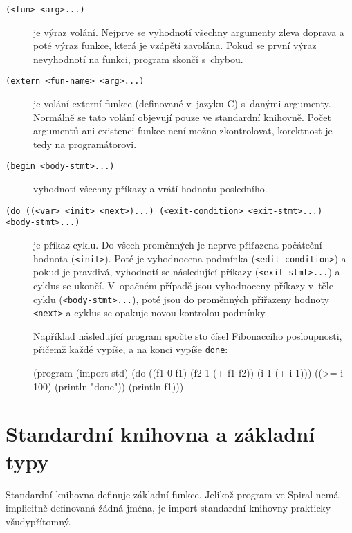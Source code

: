 \begin{description}
  \item[\texttt{(<fun> <arg>...)}] je výraz volání. Nejprve se vyhodnotí
    všechny argumenty zleva doprava a poté výraz funkce, která je vzápětí
    zavolána. Pokud se první výraz nevyhodnotí na funkci, program skončí s~chybou.

  \item[\texttt{(extern <fun-name> <arg>...)}] je volání externí funkce
    (definované v~jazyku C) s~danými argumenty. Normálně se tato volání objevují
    pouze ve standardní knihovně. Počet argumentů ani existenci funkce není
    možno zkontrolovat, korektnost je tedy na programátorovi.

  \item[\texttt{(begin <body-stmt>...)}] vyhodnotí všechny příkazy a vrátí
    hodnotu posledního.

  \item[\texttt{(do ((<var> <init> <next>)...) (<exit-condition> <exit-stmt>...)
    <body-stmt>...)}] je příkaz cyklu. Do všech proměnných je neprve přiřazena
    počáteční hodnota (\texttt{<init>}). Poté je vyhodnocena podmínka
    (\texttt{<edit-condition>}) a pokud je pravdivá, vyhodnotí se následující
    příkazy (\texttt{<exit-stmt>...}) a cyklus se ukončí. V~opačném případě jsou
    vyhodnoceny příkazy v~těle cyklu (\texttt{<body-stmt>...}), poté jsou do
    proměnných přiřazeny hodnoty \texttt{<next>} a cyklus se opakuje novou
    kontrolou podmínky.

    Například následující program spočte sto čísel Fibonacciho posloupnosti,
    přičemž každé vypíše, a na konci vypíše \texttt{done}:

\begin{spiral}
(program
  (import std)
  (do ((f1 0 f1)
       (f2 1 (+ f1 f2))
       (i  1 (+ i 1)))
    ((>= i 100)
      (println "done"))
    (println f1)))
\end{spiral}
\end{description}

\section{Standardní knihovna a základní typy}

Standardní knihovna definuje základní funkce. Jelikož program ve Spiral nemá
implicitně definovaná žádná jména, je import standardní knihovny prakticky
všudypřítomný.

